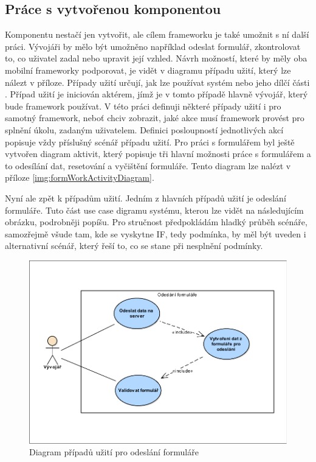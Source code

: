 \subsection{Práce s vytvořenou komponentou}
Komponentu nestačí jen vytvořit, ale cílem frameworku je také umožnit s ní další práci. Vývojáři by mělo být umožněno například odeslat formulář, zkontrolovat to, co uživatel zadal nebo upravit její vzhled. Návrh možností, které by měly oba mobilní frameworky podporovat, je vidět v diagramu případu užití, který lze nálezt v příloze. Případy užití určují, jak lze používat systém nebo jeho dílčí části \cite{UmlArlow}. Případ užití je iniciován aktérem, jímž je v tomto případě hlavně vývojář, který bude framework používat. V této práci definuji některé případy užití i pro samotný framework, neboť chciv zobrazit, jaké akce musí framework provést pro splnění úkolu, zadaným uživatelem. Definici posloupností jednotlivých akcí popisuje vždy příslušný scénář případu užití. Pro práci s formulářem byl ještě vytvořen diagram aktivit, který popisuje tři hlavní možnosti práce s formulářem a to odesílání dat, resetování a vyčištění formuláře. Tento diagram lze nalézt v příloze \ref{img:formWorkActivityDiagram}.

Nyní ale zpět k případům užití. Jedním z hlavních případů užití je odeslání formuláře. Tuto část use case digramu systému, kterou lze vidět na následujícím obrázku, podrobněji popíšu. Pro stručnost předpokládám hladký průběh scénáře, samozřejmě všude tam, kde se vyskytne IF, tedy podmínka, by měl být uveden i alternativní scénář, který řeší to, co se stane při nesplnění podmínky.
\begin{figure}[h!]
\includegraphics[width=\textwidth]{figures/useCaseFormSend}
\caption{Diagram případů užití pro odeslání formuláře}
\label{img:useCaseModelFormSend}
\end{figure}

